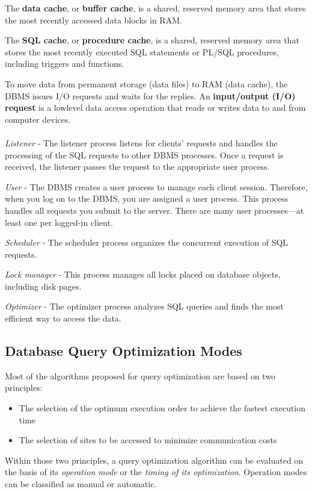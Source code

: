 \documentclass[a4paper, 11pt, titlepage]{report}
\begin{document}
The \textbf{data cache}, or \textbf{buffer cache}, is a shared, reserved memory area that stores the most recently accessed data blocks in RAM.

The \textbf{SQL cache}, or \textbf{procedure cache}, is a shared, reserved memory area that stores the most recently executed SQL statements or PL/SQL procedures, including triggers and functions.

To move data from permanent storage (data files) to RAM (data cache), the DBMS issues I/O requests and waits for the replies. An \textbf{input/output (I/O) request} is a lowlevel data access operation that reads or writes data to and from computer devices.\\\\

\textit{Listener} - The listener process listens for clients' requests and handles the processing of the SQL requests to other DBMS processes. Once a request is received, the listener
passes the request to the appropriate user process.

\textit{User} - The DBMS creates a user process to manage each client session. Therefore, when you log on to the DBMS, you are assigned a user process. This process handles all requests you submit to the server. There are many user processes—at least one per logged-in client.

\textit{Scheduler} - The scheduler process organizes the concurrent execution of SQL requests.

\textit{Lock manager} - This process manages all locks placed on database objects, including disk pages.

\textit{Optimizer} - The optimizer process analyzes SQL queries and finds the most efficient way to access the data.
\subsection{Database Query Optimization Modes}
Most of the algorithms proposed for query optimization are based on two principles:
\begin{itemize}
\item The selection of the optimum execution order to achieve the fastest execution time
\item The selection of sites to be accessed to minimize communication costs
\end{itemize}
Within those two principles, a query optimization algorithm can be evaluated on the basis of its \textit{operation mode} or the \textit{timing of its optimization}. Operation modes can be classified as manual or automatic.
\end{document}
